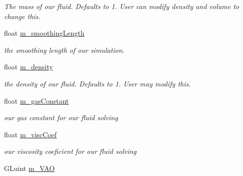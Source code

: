 \begin{DoxyCompactItemize}
\begin{DoxyCompactList}\small\item\em The mass of our fluid.  Defaults to 1. User can modify density and volume to change this. \end{DoxyCompactList}\item 
\hypertarget{class_s_p_h_engine_a81f5be51a8eeb86e0e5a42e4a2f40ef7}{float \hyperlink{class_s_p_h_engine_a81f5be51a8eeb86e0e5a42e4a2f40ef7}{m\-\_\-smoothing\-Length}}\label{class_s_p_h_engine_a81f5be51a8eeb86e0e5a42e4a2f40ef7}

\begin{DoxyCompactList}\small\item\em the smoothing length of our simulation. \end{DoxyCompactList}\item 
\hypertarget{class_s_p_h_engine_abd4a680dc909727e3026e7c3387bc3a8}{float \hyperlink{class_s_p_h_engine_abd4a680dc909727e3026e7c3387bc3a8}{m\-\_\-density}}\label{class_s_p_h_engine_abd4a680dc909727e3026e7c3387bc3a8}

\begin{DoxyCompactList}\small\item\em the density of our fluid.  Defaults to 1. User may modify this. \end{DoxyCompactList}\item 
\hypertarget{class_s_p_h_engine_ae85b89c5347bb6c5c1097e3f0d16d2b5}{float \hyperlink{class_s_p_h_engine_ae85b89c5347bb6c5c1097e3f0d16d2b5}{m\-\_\-gas\-Constant}}\label{class_s_p_h_engine_ae85b89c5347bb6c5c1097e3f0d16d2b5}

\begin{DoxyCompactList}\small\item\em our gas constant for our fluid solving \end{DoxyCompactList}\item 
\hypertarget{class_s_p_h_engine_a277d7add22691d816b05198c53bb94ab}{float \hyperlink{class_s_p_h_engine_a277d7add22691d816b05198c53bb94ab}{m\-\_\-visc\-Coef}}\label{class_s_p_h_engine_a277d7add22691d816b05198c53bb94ab}

\begin{DoxyCompactList}\small\item\em our viscosity coeficient for our fluid solving \end{DoxyCompactList}\item 
\hypertarget{class_s_p_h_engine_af7bb756facfeba1f59c195c680794fc1}{G\-Luint \hyperlink{class_s_p_h_engine_af7bb756facfeba1f59c195c680794fc1}{m\-\_\-\-V\-A\-O}}\label{class_s_p_h_engine_af7bb756facfeba1f59c195c680794fc1}


\end{DoxyCompactItemize}
